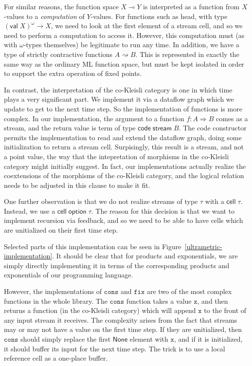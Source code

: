 \documentclass[nocopyrightspace,preprint]{sigplanconf}
\newcommand{\term}[1]{\ensuremath{\mathtt{{#1}}}}
\newcommand{\To}{\Rightarrow}
\newcommand{\shrink}{\rightsquigarrow}
\newcommand{\celltype}[1]{\mathsf{cell}\;{#1}}
\newcommand{\opttype}[1]{\mathsf{option}\;{#1}}
\newcommand{\comp}[1]{\mathsf{code}\;{#1}}
\newcommand{\streamtype}[1]{\mathsf{stream}\;{#1}}
\newcommand{\lolli}{\multimap}
\newcommand{\valtype}[1]{\mathsf{val}\;{#1}}
\newcommand{\None}{\mathsf{None}}
\begin{document}
For similar reasons, the function space $X \lolli Y$ is interpreted as
a function from $X$-values to a \emph{computation} of $Y$-values.  For
functions such as head, with type $(\valtype{X})^\omega \to X$, we need to look
at the first element of a stream cell, and so we need to perform a
computation to access it. However, this computation must (as with
$\omega$-types themselves) be legitimate to run any time.
In addition, we have a type of strictly contractive functions $A
\shrink B$. This is represented in exactly the same way as the
ordinary ML function space, but must be kept isolated in order to
support the extra operation of fixed points.

In contrast, the interpretation of the co-Kleisli category is one in
which time plays a very significant part. We implement it via a
dataflow graph which we update to get to the next time step. So the
implementation of functions is more complex. In our implementation,
the argument to a function $f : A \To B$ comes as a stream, and the
return value is term of type $\comp{\streamtype{B}}$. The code
constructor permits the implementation to read and extend the dataflow
graph, doing some initialization to return a stream cell. Surpisingly,
this result is a stream, and not a point value, the way that the
intepretation of morphisms in the co-Kleisli category might initially
suggest. In fact, our implementations actually realize the coextensions
of the morphisms of the co-Kleisli category, and the logical relation
needs to be adjusted in this clause to make it fit. 

One further observation is that we do not realize streams of type $\tau$
with a $\celltype{\tau}$. Instead, we use a $\celltype{\opttype{\tau}}$. 
The reason for this decision is that we want to implement recursion via
feedback, and so we need to be able to have cells which are unitialized
on their first time step. 

Selected parts of this implementation can be seen in
Figure~\ref{ultrametric-implementation}. It should be clear that for
products and exponentials, we are simply directly implementing it in
terms of the corresponding products and exponentials of our
programming language. 

However, the implementations of \term{cons} and \term{fix} are two of
the most complex functions in the whole library. The \term{cons}
function takes a value \term{x}, and then returns a function (in the
co-Kleisli category) which will append \term{x} to the front of any
input stream it receives. The complexity arises from the fact that
streams may or may not have a value on the first time step. If they
are unitialized, then \term{cons} should simply replace the first
$\None$ element with \term{x}, and if it is initialized, it should
buffer its input for the next time step. The trick is to use a local
reference cell as a one-place buffer. 
\end{document}
